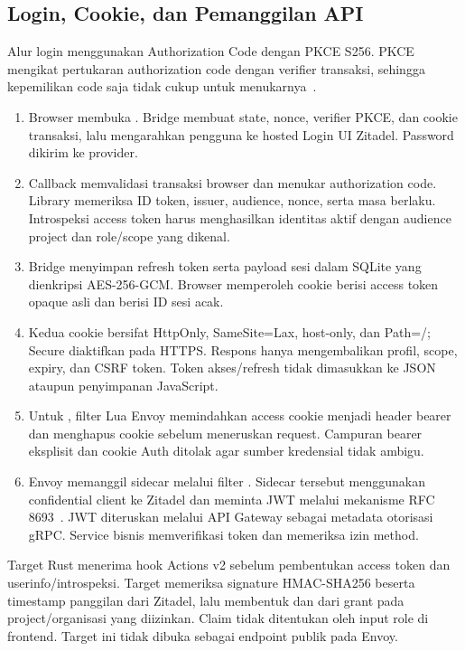 \subsection{Login, Cookie, dan Pemanggilan API}
Alur login menggunakan Authorization Code dengan PKCE S256. PKCE mengikat pertukaran authorization code dengan verifier transaksi, sehingga kepemilikan code saja tidak cukup untuk menukarnya~\cite{pkce}.
\begin{enumerate}
\item Browser membuka . Bridge membuat state, nonce, verifier PKCE, dan cookie transaksi, lalu mengarahkan pengguna ke hosted Login UI Zitadel. Password dikirim ke provider.
\item Callback memvalidasi transaksi browser dan menukar authorization code. Library  memeriksa ID token, issuer, audience, nonce, serta masa berlaku. Introspeksi access token harus menghasilkan identitas aktif dengan audience project dan role/scope yang dikenal.
\item Bridge menyimpan refresh token serta payload sesi dalam SQLite yang dienkripsi AES-256-GCM. Browser memperoleh cookie  berisi access token opaque asli dan  berisi ID sesi acak.
\item Kedua cookie bersifat HttpOnly, SameSite=Lax, host-only, dan Path=/; Secure diaktifkan pada HTTPS. Respons  hanya mengembalikan profil, scope, expiry, dan CSRF token. Token akses/refresh tidak dimasukkan ke JSON ataupun penyimpanan JavaScript.
\item Untuk , filter Lua Envoy memindahkan access cookie menjadi header bearer dan menghapus cookie sebelum meneruskan request. Campuran bearer eksplisit dan cookie Auth ditolak agar sumber kredensial tidak ambigu.
\item Envoy memanggil sidecar  melalui filter . Sidecar tersebut menggunakan confidential client ke Zitadel dan meminta JWT melalui mekanisme RFC 8693~\cite{exchange}. JWT diteruskan melalui API Gateway sebagai metadata otorisasi gRPC. Service bisnis memverifikasi token dan memeriksa izin method.
\end{enumerate}

Target Rust  menerima hook Actions v2 sebelum pembentukan access token dan userinfo/introspeksi. Target memeriksa signature HMAC-SHA256 beserta timestamp panggilan dari Zitadel, lalu membentuk  dan  dari grant pada project/organisasi yang diizinkan. Claim tidak ditentukan oleh input role di frontend. Target ini tidak dibuka sebagai endpoint publik pada Envoy.

